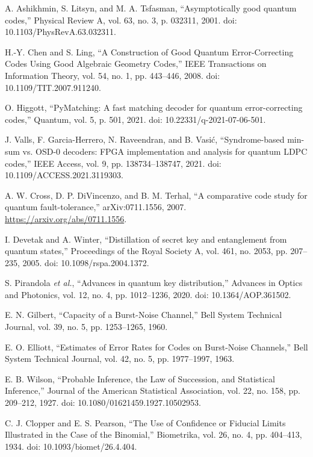 \documentclass{article}
\newcommand{\etal}{\textit{et al.}\xspace}
\begin{document}
\begin{thebibliography}{99}
A. Ashikhmin, S. Litsyn, and M. A. Tsfasman, ``Asymptotically good quantum codes,'' Physical Review A, vol. 63, no. 3, p. 032311, 2001. doi: 10.1103/PhysRevA.63.032311.

H.-Y. Chen and S. Ling, ``A Construction of Good Quantum Error-Correcting Codes Using Good Algebraic Geometry Codes,'' IEEE Transactions on Information Theory, vol. 54, no. 1, pp. 443--446, 2008. doi: 10.1109/TIT.2007.911240.

O. Higgott, ``PyMatching: A fast matching decoder for quantum error-correcting codes,'' Quantum, vol. 5, p. 501, 2021. doi: 10.22331/q-2021-07-06-501.

J. Valls, F. Garcia-Herrero, N. Raveendran, and B. Vasić, ``Syndrome-based min-sum vs. OSD-0 decoders: FPGA implementation and analysis for quantum LDPC codes,'' IEEE Access, vol. 9, pp. 138734--138747, 2021. doi: 10.1109/ACCESS.2021.3119303.

A. W. Cross, D. P. DiVincenzo, and B. M. Terhal, ``A comparative code study for quantum fault-tolerance,'' arXiv:0711.1556, 2007. \url{https://arxiv.org/abs/0711.1556}.

I. Devetak and A. Winter, ``Distillation of secret key and entanglement from quantum states,'' Proceedings of the Royal Society A, vol. 461, no. 2053, pp. 207--235, 2005. doi: 10.1098/rspa.2004.1372.

S. Pirandola \etal, ``Advances in quantum key distribution,'' Advances in Optics and Photonics, vol. 12, no. 4, pp. 1012--1236, 2020. doi: 10.1364/AOP.361502.

E. N. Gilbert, ``Capacity of a Burst-Noise Channel,'' Bell System Technical Journal, vol. 39, no. 5, pp. 1253--1265, 1960.

E. O. Elliott, ``Estimates of Error Rates for Codes on Burst-Noise Channels,'' Bell System Technical Journal, vol. 42, no. 5, pp. 1977--1997, 1963.

E. B. Wilson, ``Probable Inference, the Law of Succession, and Statistical Inference,'' Journal of the American Statistical Association, vol. 22, no. 158, pp. 209--212, 1927. doi: 10.1080/01621459.1927.10502953.

C. J. Clopper and E. S. Pearson, ``The Use of Confidence or Fiducial Limits Illustrated in the Case of the Binomial,'' Biometrika, vol. 26, no. 4, pp. 404--413, 1934. doi: 10.1093/biomet/26.4.404.


\end{thebibliography}
\end{document}
